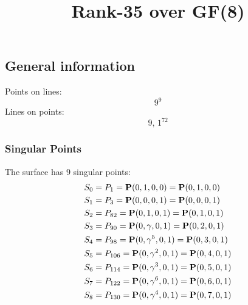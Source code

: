 \documentclass{article}
\newcommand\setTBstruts{\def\T{\rule{0pt}{2.6ex}}%
\def\B{\rule[-1.2ex]{0pt}{0pt}}}
\newcommand{\bP}{{\bf P}}
\begin{document}
 
\setTBstruts



{\allowdisplaybreaks%






\title{Rank-35 over GF(8)}
\author{}%
\maketitle%
%
{}



\subsection*{General information}
Points on lines:
$$
9^9$$
Lines on points:
$$
9,\,1^{72}$$
\subsubsection*{Singular Points}
The surface has 9 singular points:\\
\begin{align*}
S_{0} &= P_{1}=\bP(0, 1, 0, 0) = \bP(0, 1, 0, 0)\\
S_{1} &= P_{3}=\bP(0, 0, 0, 1) = \bP(0, 0, 0, 1)\\
S_{2} &= P_{82}=\bP(0, 1, 0, 1) = \bP(0, 1, 0, 1)\\
S_{3} &= P_{90}=\bP(0, \gamma , 0, 1) = \bP(0, 2, 0, 1)\\
S_{4} &= P_{98}=\bP(0, \gamma^{5}, 0, 1) = \bP(0, 3, 0, 1)\\
S_{5} &= P_{106}=\bP(0, \gamma^{2}, 0, 1) = \bP(0, 4, 0, 1)\\
S_{6} &= P_{114}=\bP(0, \gamma^{3}, 0, 1) = \bP(0, 5, 0, 1)\\
S_{7} &= P_{122}=\bP(0, \gamma^{6}, 0, 1) = \bP(0, 6, 0, 1)\\
S_{8} &= P_{130}=\bP(0, \gamma^{4}, 0, 1) = \bP(0, 7, 0, 1)\\
\end{align*}
}
\end{document}
